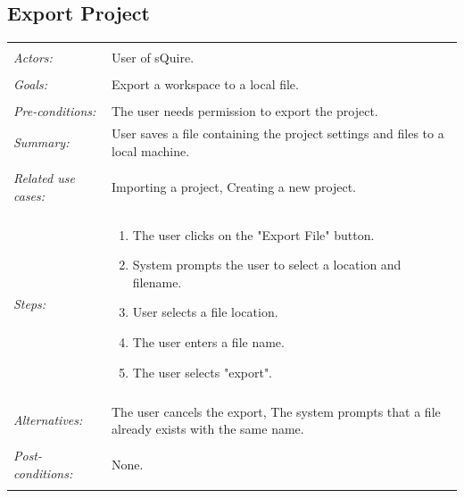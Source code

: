 \documentclass[11pt]{report}
\begin{document}
\subsection{Export Project}
\begin{tabular}{ p{2cm} p{12cm} }
\hline
\\
\textit{Actors:} & User of sQuire.\\
\\
\textit{Goals:} & Export a workspace to a local file. \\
\\
\textit{Pre-conditions:} & The user needs permission to export the project. 
\\
\textit{Summary:} & User saves a file containing the project settings and files to a local machine. \\
\\
\textit{Related use cases:} & Importing a project, Creating a new project. \\
\\
\textit{Steps:} & \begin{enumerate}
 \item The user clicks on the "Export File" button. 
 \item System prompts the user to select a location and filename. 
 \item User selects a file location.
 \item The user enters a file name.
 \item The user selects "export". 
 \end{enumerate}\\
 \\
 \textit{Alternatives:} & The user cancels the export, The system prompts that a file already exists with the same name.\\
 \\
 \textit{Post-conditions:} & None. \\
 \\
\hline
\end{tabular}
\end{document}
